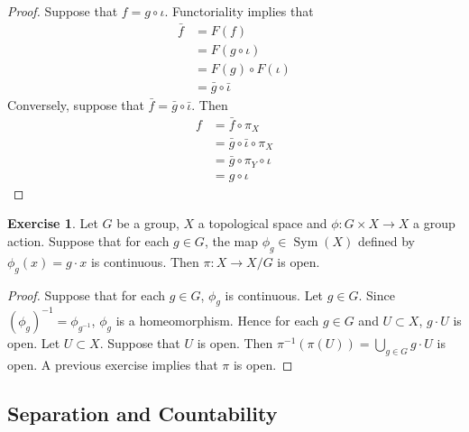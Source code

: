 \documentclass[12pt]{amsart}
\theoremstyle{definition}
\newtheorem{ex}[definition]{Exercise}
\DeclareMathOperator{\Sym}{Sym}
\DeclareMathOperator*{\0}{\mbf{0}}
\DeclareMathOperator*{\1}{\mbf{1}}
\begin{document}
	\begin{proof}
		Suppose that $f = g \circ \iota$. Functoriality implies that 
		\begin{align*}
			\bar{f} 
			& = F(f) \\
			& = F(g \circ \iota) \\
			& = F(g) \circ F(\iota) \\
			&= \bar{g} \circ \bar{\iota}
		\end{align*}
		Conversely, suppose that $\bar{f} = \bar{g} \circ \bar{\iota}$. Then
		\begin{align*}
			f
			& = \bar{f} \circ \pi_X \\
			& = \bar{g} \circ \bar{\iota} \circ \pi_X \\
			& = \bar{g} \circ \pi_Y \circ \iota \\
			& = g \circ \iota 
		\end{align*}
	\end{proof}
	
	\begin{ex}
		Let $G$ be a group, $X$ a topological space and $\phi: G \times X \rightarrow X$ a group action. Suppose that for each $g \in G$, the map $\phi_g \in \Sym(X)$ defined by $\phi_g(x) = g \cdot x$ is continuous. Then $\pi: X \rightarrow X / G$ is open. 
	\end{ex}

	\begin{proof}
		Suppose that for each $g \in G$, $\phi_g$ is continuous. Let $g \in G$. Since $(\phi_g)^{-1} = \phi_{g^{-1}}$, $\phi_g$ is a homeomorphism. Hence for each $g \in G$ and $U \subset X$, $g \cdot U$ is open. Let $U \subset X$. Suppose that $U$ is open. Then $\pi^{-1}(\pi(U)) = \bigcup_{g \in G} g \cdot U$ is open. A previous exercise implies that $\pi$ is open.
	\end{proof}

	
	
	
	
	
	
	
	
	
	
	
	
	
	
	
	
	
	
	
	
	
	
	
	
	
	
	
	\newpage
	\subsection{Separation and Countability}
	
\end{document}
